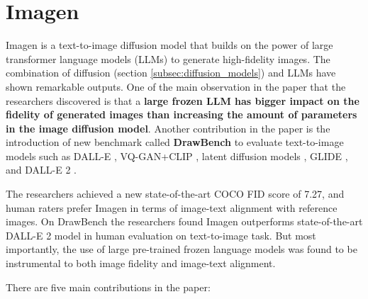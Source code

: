 \section{Imagen}
\label{sec:imagen}

Imagen \cite{imagen} is a text-to-image diffusion model that builds on the power of large transformer language models \cite{transformer} (LLMs) to generate high-fidelity images. The combination of diffusion (section \ref{subsec:diffusion_models}) and LLMs have shown remarkable outputs. One of the main observation in the paper that the researchers discovered is that a \textbf{large frozen LLM has bigger impact on the fidelity of generated images than increasing the amount of parameters in the image diffusion model}. Another contribution in the paper is the introduction of new benchmark called \textbf{DrawBench} to evaluate text-to-image models such as DALL-E \cite{dalle}, VQ-GAN+CLIP \cite{vqgan_clip}, latent diffusion models \cite{stable_diffusion}, GLIDE \cite{glide}, and DALL-E 2 \cite{dalle_2}.

The researchers achieved a new state-of-the-art COCO FID score of 7.27, and human raters prefer Imagen in terms of image-text alignment with reference images. On DrawBench the researchers found Imagen outperforms state-of-the-art DALL-E 2 model in human evaluation on text-to-image task. But most importantly, the use of large pre-trained frozen language models was found to be instrumental to both image fidelity and image-text alignment.

There are five main contributions in the paper:

